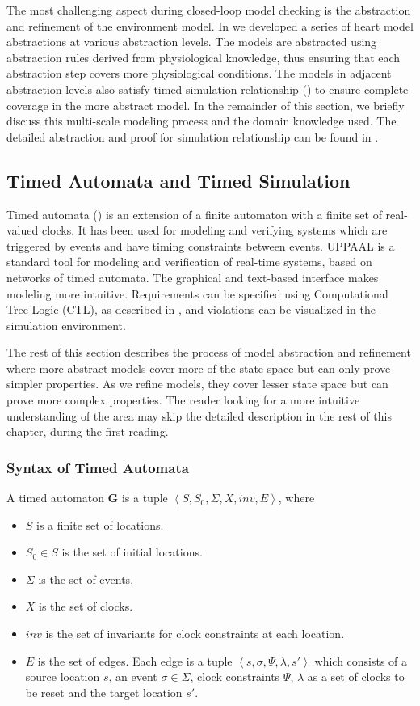 The most challenging aspect during closed-loop model checking is the abstraction and refinement of the environment model. In \cite{STTT13} we developed a series of heart model abstractions at various abstraction levels. The models are abstracted using abstraction rules derived from physiological knowledge, thus ensuring that each abstraction step covers more physiological conditions. The models in adjacent abstraction levels also satisfy \textsf{timed-simulation} relationship (\cite{simulation}) to ensure complete coverage in the more abstract model. In the remainder of this section, we briefly discuss this multi-scale modeling process and the domain knowledge used. The detailed abstraction and proof for simulation relationship can be found in \cite{STTT13}.

\subsection{Timed Automata and Timed Simulation}
Timed automata (\cite{timed_automata}) is an extension of a finite automaton with a finite set of real-valued clocks. It has been used for modeling and verifying systems which are triggered by events and have timing constraints between events.  UPPAAL is a standard tool for modeling and verification of real-time systems, based on networks of timed automata. The graphical and text-based interface makes modeling more intuitive. Requirements can be specified using Computational Tree Logic (CTL), as described in \cite{Clarke}, and violations can be visualized in the simulation environment.

The rest of this section describes the process of model abstraction and refinement where more abstract models cover more of the state space but can only prove simpler properties. As we refine models, they cover lesser state space but can prove more complex properties. The reader looking for a more intuitive understanding of the area may skip the detailed description in the rest of this chapter, during the first reading.

\subsubsection{Syntax of Timed Automata}
A timed automaton \textbf{G} is a tuple $\left\langle S,S_0,\Sigma,X,inv,E\right\rangle$, where

\begin{itemize}
	\item $S$ is a finite set of locations.
	\item $S_0\in S$ is the set of initial locations.
	\item $\Sigma$ is the set of events.
	\item $X$ is the set of clocks.
	\item $inv$ is the set of invariants for clock constraints at each location.
	\item $E$ is the set of edges. Each edge is a tuple $\left\langle s,\sigma,\Psi,\lambda,s'\right\rangle$ which consists of a source location $s$, an event $\sigma\in\Sigma$, clock constraints $\Psi$, $\lambda$ as a set of clocks to be reset and the target location $s'$.   
\end{itemize}

